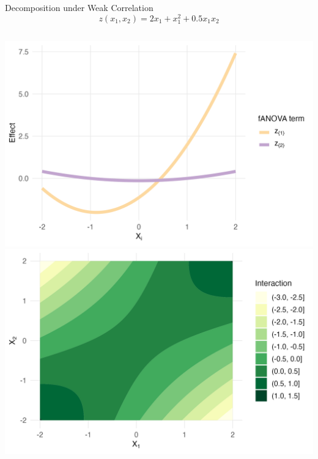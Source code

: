\begin{frame}{Decomposition under Weak Correlation}
    \[
    z(x_1, x_2) = 2x_1 + x_1^2 + 0.5 x_1 x_2
    \]
  \begin{columns}
      \includegraphics[width=\linewidth]{../images/experiment_section/full_a1p20_a2p00_a11p10_a22p00_a12p05_rhop03_main.png}
      \includegraphics[width=\linewidth]{../images/experiment_section/full_a1p20_a2p00_a11p10_a22p00_a12p05_rhop03_interaction.png}
  \end{columns}
  
\end{frame}

